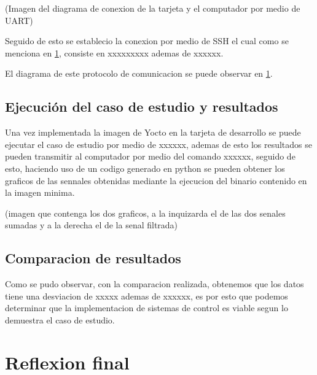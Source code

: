 (Imagen del diagrama de conexion de la tarjeta y el computador por medio de UART)

Seguido de esto se establecio la conexion por medio de SSH el cual como se menciona en \ref{}, consiste en xxxxxxxxx ademas de xxxxxx. 

El diagrama de este protocolo de comunicacion se puede observar en \ref{}.


\subsection{Ejecución del caso de estudio y resultados}

Una vez implementada la imagen de Yocto en la tarjeta de desarrollo se puede ejecutar el caso de estudio por medio de xxxxxx, ademas de esto los resultados se pueden transmitir al computador por medio del comando xxxxxx, seguido de esto, haciendo uso de un codigo generado en python se pueden obtener los graficos de las sennales obtenidas mediante la ejecucion del binario contenido en la imagen minima.

(imagen que contenga los dos graficos, a la inquizarda el de las dos senales sumadas y a la derecha el de la senal filtrada)

\subsection{Comparacion de resultados}

Como se pudo observar, con la comparacion realizada, obtenemos que los datos tiene una desviacion de xxxxx ademas de xxxxxx, es por esto que podemos determinar que la implementacion de sistemas de control es viable segun lo demuestra el caso de estudio.


\section{Reflexion final}